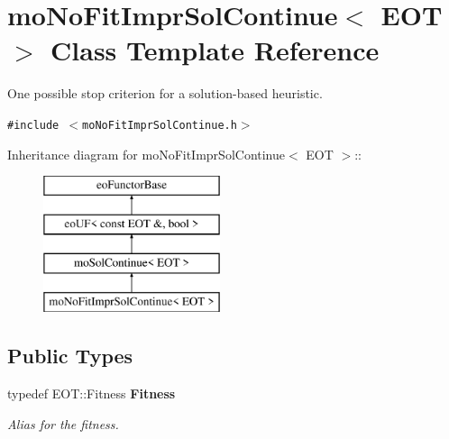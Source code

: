 \section{moNoFitImprSolContinue$<$ EOT $>$ Class Template Reference}
\label{classmo_no_fit_impr_sol_continue}
One possible stop criterion for a solution-based heuristic.  


{\tt \#include $<$moNoFitImprSolContinue.h$>$}

Inheritance diagram for moNoFitImprSolContinue$<$ EOT $>$::\begin{figure}[H]
\begin{center}
\leavevmode
\includegraphics[height=4cm]{classmo_no_fit_impr_sol_continue}
\end{center}
\end{figure}
\subsection*{Public Types}
\begin{CompactItemize}
\item 
typedef EOT::Fitness {\bf Fitness}\label{classmo_no_fit_impr_sol_continue_64c184de66bb37d75d53aa600ac947b3}

\begin{CompactList}\small\item\em Alias for the fitness. \item\end{CompactList}\end{CompactItemize}

